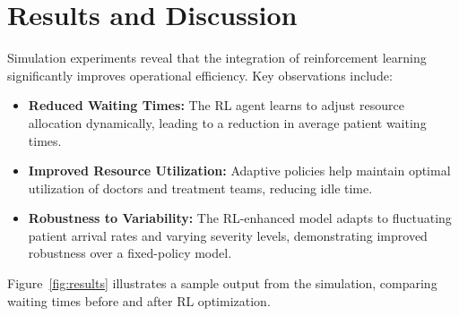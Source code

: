 \documentclass[12pt]{article}
\begin{document}
\section{Results and Discussion}
Simulation experiments reveal that the integration of reinforcement learning significantly improves operational efficiency. Key observations include:
\begin{itemize}[noitemsep]
    \item \textbf{Reduced Waiting Times:} The RL agent learns to adjust resource allocation dynamically, leading to a reduction in average patient waiting times.
    \item \textbf{Improved Resource Utilization:} Adaptive policies help maintain optimal utilization of doctors and treatment teams, reducing idle time.
    \item \textbf{Robustness to Variability:} The RL-enhanced model adapts to fluctuating patient arrival rates and varying severity levels, demonstrating improved robustness over a fixed-policy model.
\end{itemize}
Figure~\ref{fig:results} illustrates a sample output from the simulation, comparing waiting times before and after RL optimization.
\end{document}
